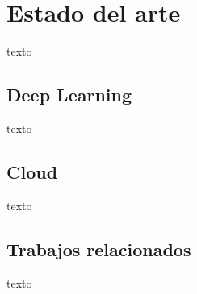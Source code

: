 \chapter{Estado del arte}

texto

\section{Deep Learning}

texto

\section{Cloud}

texto

\section{Trabajos relacionados}

texto
